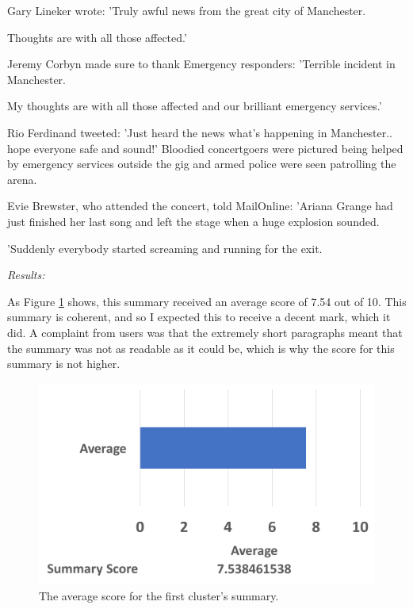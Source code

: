 \documentclass[12pt]{article}
\begin{document}
\begin{mdframed}
Gary Lineker wrote: 'Truly awful news from the great city of Manchester.

Thoughts are with all those affected.'

Jeremy Corbyn made sure to thank Emergency responders: 'Terrible incident in Manchester.

My thoughts are with all those affected and our brilliant emergency services.'

Rio Ferdinand tweeted: 'Just heard the news what's happening in Manchester.. hope everyone safe and sound!' Bloodied concertgoers were pictured being helped by emergency services outside the gig and armed police were seen patrolling the arena.

Evie Brewster, who attended the concert, told MailOnline: 'Ariana Grange had just finished her last song and left the stage when a huge explosion sounded.

'Suddenly everybody started screaming and running for the exit. \\

\end{mdframed}

\emph{Results:}

As Figure \ref{summ1} shows, this summary received an average score of 7.54 out of 10. This summary is coherent, and so I expected this to receive a decent mark, which it did. A complaint from users was that the extremely short paragraphs meant that the summary was not as readable as it could be, which is why the score for this summary is not higher. \\

\begin{figure}[ht!]
  \centering
    \includegraphics[scale=0.6]{summ1score.png}
   \caption[The average score for a summary]{The average score for the first cluster's summary.}
   \label{summ1}
\end{figure} 
\end{document}
